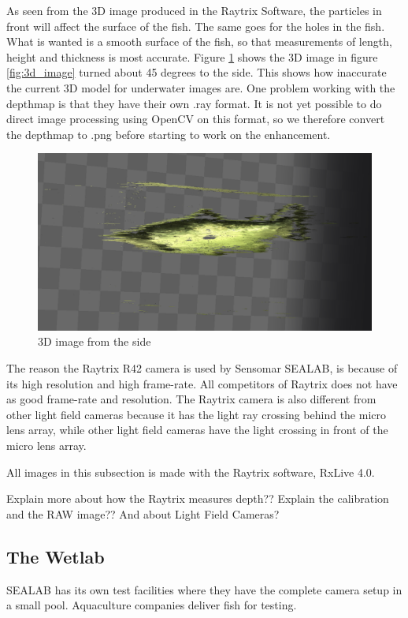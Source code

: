 As seen from the 3D image produced in the Raytrix Software, the particles in front will affect the surface of the fish. The same goes for the holes in the fish. What is wanted is a smooth surface of the fish, so that measurements of length, height and thickness is most accurate. Figure \ref{fig:3d_image_side} shows the 3D image in figure \ref{fig:3d_image} turned about 45 degrees to the side. This shows how inaccurate the current 3D model for underwater images are. 
One problem working with the depthmap is that they have their own .ray format. It is not yet possible to do direct image processing using OpenCV on this format, so we therefore convert the depthmap to .png before starting to work on the enhancement.

\begin{figure}[h]
    \centering
    \includegraphics[width=.9\linewidth]{images/introduction/depth3D_side}
    \caption{3D image from the side}
    \label{fig:3d_image_side}
\end{figure}

The reason the Raytrix R42 camera is used by Sensomar SEALAB, is because of its high resolution and high frame-rate. All competitors of Raytrix does not have as good frame-rate and resolution. The Raytrix camera is also different from other light field cameras because it has the light ray crossing behind the micro lens array, while other light field cameras have the light crossing in front of the micro lens array.

All images in this subsection is made with the Raytrix software, RxLive 4.0.

{\color{red}Explain more about how the Raytrix measures depth?? Explain the calibration and the RAW image?? And about Light Field Cameras?}




\subsection{The Wetlab}\label{wetlab}

SEALAB has its own test facilities where they have the complete camera setup in a small pool. Aquaculture companies deliver fish for testing.